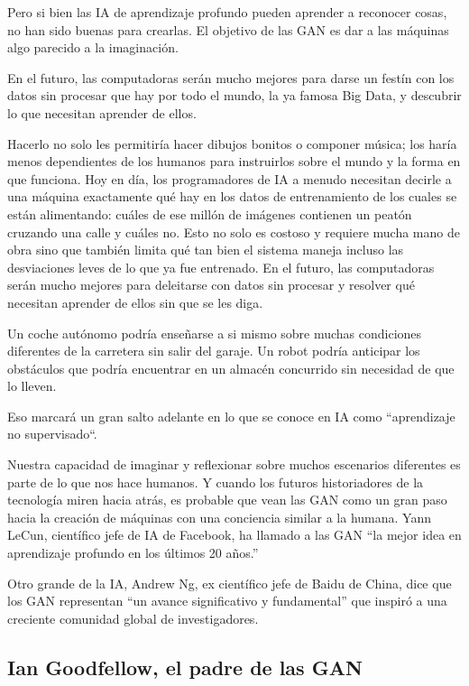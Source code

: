 \documentclass[a4paper]{article}
\begin{document}
Pero si bien las IA de aprendizaje profundo pueden aprender a 
reconocer cosas, no han sido buenas para crearlas. El objetivo de 
las GAN es dar a las máquinas algo parecido a la imaginación.

En el futuro, las computadoras serán mucho mejores para darse un 
festín con los datos sin procesar que hay por todo el mundo, la ya 
famosa Big Data, y descubrir lo que necesitan aprender de ellos.

Hacerlo no solo les permitiría hacer dibujos bonitos o componer 
música; los haría menos dependientes de los humanos
para instruirlos sobre el mundo y la forma en que funciona. Hoy en 
día, los programadores de IA a menudo necesitan decirle a una 
máquina exactamente qué hay en los datos de entrenamiento de los 
cuales se están alimentando: cuáles de ese millón de imágenes 
contienen un peatón cruzando una calle y cuáles
no. Esto no solo es costoso y requiere mucha mano de obra sino que 
también limita qué tan bien el sistema maneja incluso las 
desviaciones leves de lo que ya fue entrenado. En el futuro, las 
computadoras serán mucho mejores para deleitarse con datos sin 
procesar y resolver qué necesitan aprender de ellos sin que se les 
diga.

 Un coche autónomo podría enseñarse a si mismo sobre muchas 
 condiciones diferentes de la carretera sin salir del garaje. Un 
 robot podría anticipar los obstáculos que podría encuentrar en un 
 almacén concurrido sin necesidad de que lo lleven.

Eso marcará un gran salto adelante en lo que se conoce en IA como 
``aprendizaje no supervisado``.

Nuestra capacidad de imaginar y reflexionar sobre muchos 
escenarios diferentes es parte de lo que nos hace humanos. Y 
cuando los futuros historiadores de la tecnología miren hacia 
atrás, es probable que vean las GAN como un gran paso hacia la 
creación de máquinas con una conciencia similar a la humana. Yann 
LeCun, científico jefe de IA de Facebook, ha llamado a las GAN “la 
mejor idea en aprendizaje profundo en los últimos 20 años.” 

Otro grande de la IA, Andrew Ng, ex científico jefe de Baidu de 
China, dice que los GAN representan ``un
avance significativo y fundamental” que inspiró a una creciente 
comunidad global de investigadores.

\subsection{Ian Goodfellow, el padre de las GAN}
\end{document}
